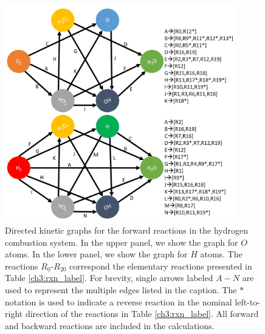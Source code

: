\begin{figure}[htbp]
	\caption[Directed kinetic graphs for the forward reactions in H$_2$-O$_2$ system]
	{Directed kinetic graphs for the forward reactions in the
hydrogen combustion system. In the upper panel, we show the graph
for $O$ atoms. In the lower panel, we show the graph for $H$ atoms. The
reactions $R_0$-$R_{20}$ correspond the elementary reactions presented in
Table \ref{ch3:rxn_label}. For brevity, single arrows labeled $A-N$ are used to represent
the multiple edges listed in the caption. The $\ast$ notation is used to
indicate a reverse reaction in the nominal left-to-right direction of the
reactions in Table \ref{ch3:rxn_label}. All forward and backward reactions are included
in the calculations.}
    \begin{center}
	\includegraphics[width=100mm]{figs/chapter4/fig4.png}
    \end{center}
\label{ch4:fig:4}
\end{figure}
\newline
